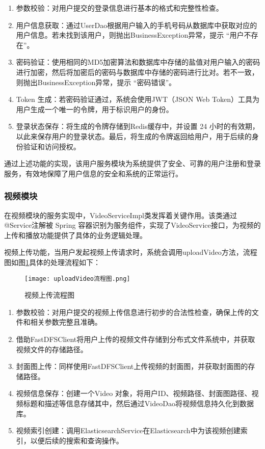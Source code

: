 \begin{enumerate}[label=(\arabic*)]
    \item 参数校验：对用户提交的登录信息进行基本的格式和完整性检查。
    \item 用户信息获取：通过UserDao根据用户输入的手机号码从数据库中获取对应的用户信息。若未找到该用户，则抛出BusinessException异常，提示 “用户不存在”。
    \item 密码验证：使用相同的MD5加密算法和数据库中存储的盐值对用户输入的密码进行加密，然后将加密后的密码与数据库中存储的密码进行比对。若不一致，则抛出BusinessException异常，提示 “密码错误”。
    \item Token 生成：若密码验证通过，系统会使用JWT（JSON Web Token）工具为用户生成一个唯一的令牌，用于标识用户的身份。
    \item 登录状态保存：将生成的令牌存储到Redis缓存中，并设置 24 小时的有效期，以此来保存用户的登录状态。最后，将生成的令牌返回给用户，用于后续的身份验证和访问授权。

\end{enumerate}

通过上述功能的实现，该用户服务模块为系统提供了安全、可靠的用户注册和登录服务，有效地保障了用户信息的安全和系统的正常运行。

\subsubsection{视频模块}

在视频模块的服务实现中，VideoServiceImpl类发挥着关键作用。该类通过@Service注解被 Spring 容器识别为服务组件，实现了VideoService接口，为视频的上传和播放功能提供了具体的业务逻辑处理。

视频上传功能，当用户发起视频上传请求时，系统会调用uploadVideo方法，流程图如图\ref{视频上传流程图}具体的处理流程如下：

\begin{figure}[hbt]
    \centering
    \texttt{[image: uploadVideo流程图.png]}
    \caption{视频上传流程图}
    \label{视频上传流程图}
\end{figure}

\begin{enumerate}[label=(\arabic*)]
    \item 参数校验：对用户提交的视频上传信息进行初步的合法性检查，确保上传的文件和相关参数完整且准确。
    \item 借助FastDFSClient将用户上传的视频文件存储到分布式文件系统中，并获取视频文件的存储路径。
    \item 封面图上传：同样使用FastDFSClient上传视频的封面图，并获取封面图的存储路径。
    \item 视频信息保存：创建一个Video 对象，将用户ID、视频路径、封面图路径、视频标题和描述等信息存储其中，然后通过VideoDao将视频信息持久化到数据库。
    \item 视频索引创建：调用ElasticsearchService在Elasticsearch中为该视频创建索引，以便后续的搜索和查询操作。
\end{enumerate}

